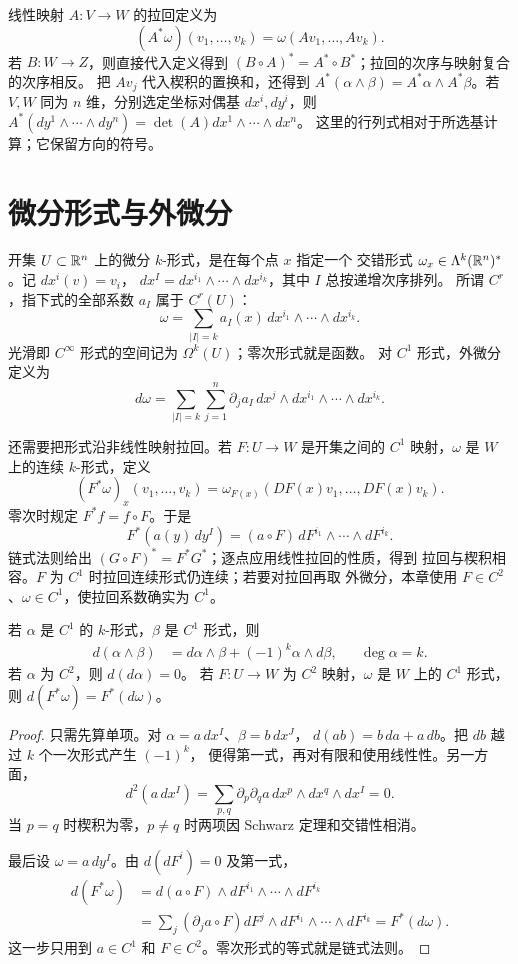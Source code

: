 线性映射 $A:V\to W$ 的拉回定义为
\[
 (A^*\omega)(v_1,\ldots,v_k)=\omega(Av_1,\ldots,Av_k).
\]
若 $B:W\to Z$，则直接代入定义得到
$(B\circ A)^*=A^*\circ B^*$；拉回的次序与映射复合的次序相反。
把 $Av_j$ 代入楔积的置换和，还得到
$A^*(\alpha\wedge\beta)=A^*\alpha\wedge A^*\beta$。若 $V,W$ 同为
$n$ 维，分别选定坐标对偶基 $dx^i,dy^i$，则
$A^*(dy^1\wedge\cdots\wedge dy^n)=\det(A)dx^1\wedge\cdots\wedge dx^n$。
这里的行列式相对于所选基计算；它保留方向的符号。

\section{微分形式与外微分}

开集 $U\subset\mathbb{R}^n$ 上的微分 $k$-形式，是在每个点 $x$ 指定一个
交错形式 $\omega_x\in\Lambda^k(\mathbb{R}^n)^*$。记 $dx^i(v)=v_i$，
$dx^I=dx^{i_1}\wedge\cdots\wedge dx^{i_k}$，其中 $I$ 总按递增次序排列。
所谓 $C^r$，指下式的全部系数 $a_I$ 属于 $C^r(U)$：
\[
 \omega=\sum_{|I|=k}a_I(x)\,dx^{i_1}\wedge\cdots\wedge dx^{i_k}.
\]
光滑即 $C^\infty$ 形式的空间记为 $\Omega^k(U)$；零次形式就是函数。
对 $C^1$ 形式，外微分定义为
\[
 d\omega=\sum_{|I|=k}\sum_{j=1}^n
 \partial_ja_I\,dx^j\wedge dx^{i_1}\wedge\cdots\wedge dx^{i_k}.
\]

还需要把形式沿非线性映射拉回。若 $F:U\to W$ 是开集之间的 $C^1$
映射，$\omega$ 是 $W$ 上的连续 $k$-形式，定义
\[
 (F^*\omega)_x(v_1,\ldots,v_k)
 =\omega_{F(x)}(DF(x)v_1,\ldots,DF(x)v_k).
\]
零次时规定 $F^*f=f\circ F$。于是
\[
 F^*(a(y)\,dy^I)=(a\circ F)\,dF^{i_1}\wedge\cdots\wedge dF^{i_k}.
\]
链式法则给出 $(G\circ F)^*=F^*G^*$；逐点应用线性拉回的性质，得到
拉回与楔积相容。$F$ 为 $C^1$ 时拉回连续形式仍连续；若要对拉回再取
外微分，本章使用 $F\in C^2$、$\omega\in C^1$，使拉回系数确实为 $C^1$。

\begin{theorem}[外微分的代数性质]
\label{thm:exterior-derivative-properties}
若 $\alpha$ 是 $C^1$ 的 $k$-形式，$\beta$ 是 $C^1$ 形式，则
\begin{align*}
 d(\alpha\wedge\beta)&=d\alpha\wedge\beta+(-1)^k\alpha\wedge d\beta,
 &&\deg\alpha=k.
\end{align*}
若 $\alpha$ 为 $C^2$，则 $d(d\alpha)=0$。
若 $F:U\to W$ 为 $C^2$ 映射，$\omega$ 是 $W$ 上的 $C^1$ 形式，则
$d(F^*\omega)=F^*(d\omega)$。
\end{theorem}

\begin{proof}
只需先算单项。对 $\alpha=a\,dx^I$、$\beta=b\,dx^J$，
$d(ab)=b\,da+a\,db$。把 $db$ 越过 $k$ 个一次形式产生 $(-1)^k$，
便得第一式，再对有限和使用线性性。另一方面，
\[
 d^2(a\,dx^I)=\sum_{p,q}\partial_p\partial_q a\,
 dx^p\wedge dx^q\wedge dx^I=0.
\]
当 $p=q$ 时楔积为零，$p\ne q$ 时两项因 Schwarz 定理和交错性相消。

最后设 $\omega=a\,dy^I$。由 $d(dF^i)=0$ 及第一式，
\begin{align*}
 d(F^*\omega)
 &=d(a\circ F)\wedge dF^{i_1}\wedge\cdots\wedge dF^{i_k}\\
 &=\sum_j(\partial_j a\circ F)dF^j\wedge dF^{i_1}\wedge\cdots\wedge dF^{i_k}
 =F^*(d\omega).
\end{align*}
这一步只用到 $a\in C^1$ 和 $F\in C^2$。零次形式的等式就是链式法则。
\end{proof}

